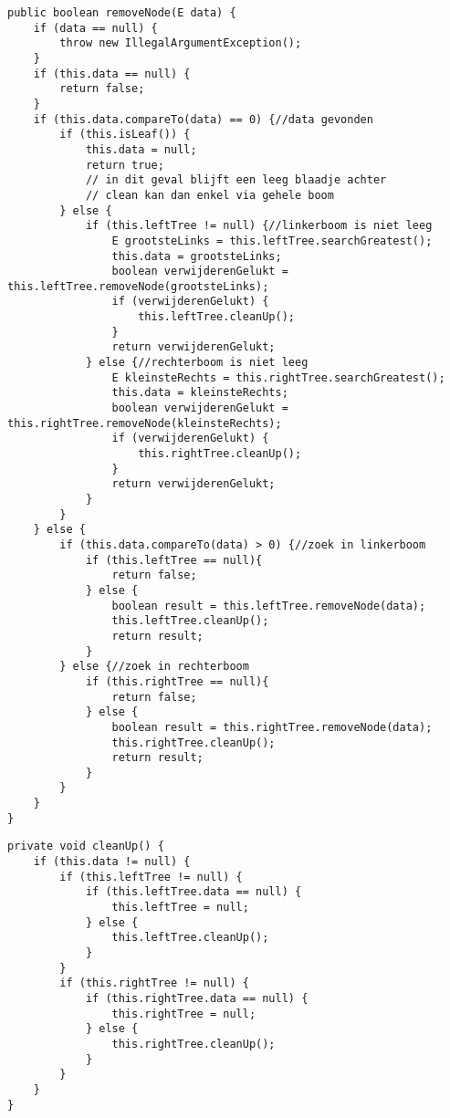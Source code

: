 \begin{Oplossing}{3.8}
\begin{lstlisting}[caption={removeNode methode}, label=bstremovenode]
public boolean removeNode(E data) {
	if (data == null) {
		throw new IllegalArgumentException();
	}
	if (this.data == null) {
		return false;
	}
	if (this.data.compareTo(data) == 0) {//data gevonden
		if (this.isLeaf()) {
			this.data = null;
			return true;
			// in dit geval blijft een leeg blaadje achter
			// clean kan dan enkel via gehele boom
		} else {
			if (this.leftTree != null) {//linkerboom is niet leeg
				E grootsteLinks = this.leftTree.searchGreatest();
				this.data = grootsteLinks;
				boolean verwijderenGelukt = this.leftTree.removeNode(grootsteLinks);
				if (verwijderenGelukt) {
					this.leftTree.cleanUp();
				}
				return verwijderenGelukt;
			} else {//rechterboom is niet leeg
				E kleinsteRechts = this.rightTree.searchGreatest();
				this.data = kleinsteRechts;
				boolean verwijderenGelukt = this.rightTree.removeNode(kleinsteRechts);
				if (verwijderenGelukt) {
					this.rightTree.cleanUp();
				}
				return verwijderenGelukt;
			}
		}
	} else {
		if (this.data.compareTo(data) > 0) {//zoek in linkerboom
			if (this.leftTree == null){
				return false;
			} else {
				boolean result = this.leftTree.removeNode(data);
				this.leftTree.cleanUp();
				return result;
			}
		} else {//zoek in rechterboom
			if (this.rightTree == null){
				return false;
			} else {
				boolean result = this.rightTree.removeNode(data);
				this.rightTree.cleanUp();
				return result;
			}
		}
	}
}
\end{lstlisting}

\end{Oplossing}
\begin{Oplossing}{3.9}
\begin{lstlisting}[caption={ruimOp methode}, label=bstruimop]
private void cleanUp() {
	if (this.data != null) {
		if (this.leftTree != null) {
			if (this.leftTree.data == null) {
				this.leftTree = null;
			} else {
				this.leftTree.cleanUp();
			}
		}
		if (this.rightTree != null) {
			if (this.rightTree.data == null) {
				this.rightTree = null;
			} else {
				this.rightTree.cleanUp();
			}
		}
	}
}
\end{lstlisting}
\end{Oplossing}
